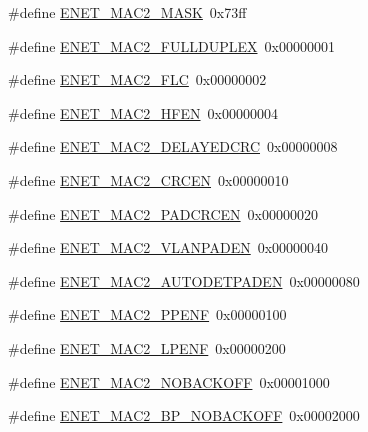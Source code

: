 \begin{DoxyCompactItemize}
\item 
\#define \hyperlink{group___e_n_e_t__17_x_x__40_x_x_ga090fe0a3c430ad527911dd8948323e56}{E\+N\+E\+T\+\_\+\+M\+A\+C2\+\_\+\+M\+A\+S\+K}~0x73ff
\item 
\#define \hyperlink{group___e_n_e_t__17_x_x__40_x_x_gada771902490e3391858094a565832f75}{E\+N\+E\+T\+\_\+\+M\+A\+C2\+\_\+\+F\+U\+L\+L\+D\+U\+P\+L\+E\+X}~0x00000001
\item 
\#define \hyperlink{group___e_n_e_t__17_x_x__40_x_x_ga572da08adf7e20dd2e9689c4a1bc6ee8}{E\+N\+E\+T\+\_\+\+M\+A\+C2\+\_\+\+F\+L\+C}~0x00000002
\item 
\#define \hyperlink{group___e_n_e_t__17_x_x__40_x_x_ga8937f821f7f1aa8aee29db2ade25085f}{E\+N\+E\+T\+\_\+\+M\+A\+C2\+\_\+\+H\+F\+E\+N}~0x00000004
\item 
\#define \hyperlink{group___e_n_e_t__17_x_x__40_x_x_ga87f7319213d7ad9c90e61ca1330ab531}{E\+N\+E\+T\+\_\+\+M\+A\+C2\+\_\+\+D\+E\+L\+A\+Y\+E\+D\+C\+R\+C}~0x00000008
\item 
\#define \hyperlink{group___e_n_e_t__17_x_x__40_x_x_gad21fa9aa92b57dff934b097738297a38}{E\+N\+E\+T\+\_\+\+M\+A\+C2\+\_\+\+C\+R\+C\+E\+N}~0x00000010
\item 
\#define \hyperlink{group___e_n_e_t__17_x_x__40_x_x_ga2e96a6046b10faf1b2e490ca0c44fe5e}{E\+N\+E\+T\+\_\+\+M\+A\+C2\+\_\+\+P\+A\+D\+C\+R\+C\+E\+N}~0x00000020
\item 
\#define \hyperlink{group___e_n_e_t__17_x_x__40_x_x_gaff48f524d6da4e540a30879dabebd6c4}{E\+N\+E\+T\+\_\+\+M\+A\+C2\+\_\+\+V\+L\+A\+N\+P\+A\+D\+E\+N}~0x00000040
\item 
\#define \hyperlink{group___e_n_e_t__17_x_x__40_x_x_ga7d73ffbca6a6db5a5262bb59e33627ed}{E\+N\+E\+T\+\_\+\+M\+A\+C2\+\_\+\+A\+U\+T\+O\+D\+E\+T\+P\+A\+D\+E\+N}~0x00000080
\item 
\#define \hyperlink{group___e_n_e_t__17_x_x__40_x_x_gabd9c8010102840735375d5b1bfd3ca73}{E\+N\+E\+T\+\_\+\+M\+A\+C2\+\_\+\+P\+P\+E\+N\+F}~0x00000100
\item 
\#define \hyperlink{group___e_n_e_t__17_x_x__40_x_x_gaa1c082cfc7d20fb9683a0a17c355fccf}{E\+N\+E\+T\+\_\+\+M\+A\+C2\+\_\+\+L\+P\+E\+N\+F}~0x00000200
\item 
\#define \hyperlink{group___e_n_e_t__17_x_x__40_x_x_ga914e8c639aaf94a0b451153485a2c1dc}{E\+N\+E\+T\+\_\+\+M\+A\+C2\+\_\+\+N\+O\+B\+A\+C\+K\+O\+F\+F}~0x00001000
\item 
\#define \hyperlink{group___e_n_e_t__17_x_x__40_x_x_ga43f27812a197029734f14e6d43671564}{E\+N\+E\+T\+\_\+\+M\+A\+C2\+\_\+\+B\+P\+\_\+\+N\+O\+B\+A\+C\+K\+O\+F\+F}~0x00002000

\end{DoxyCompactItemize}

